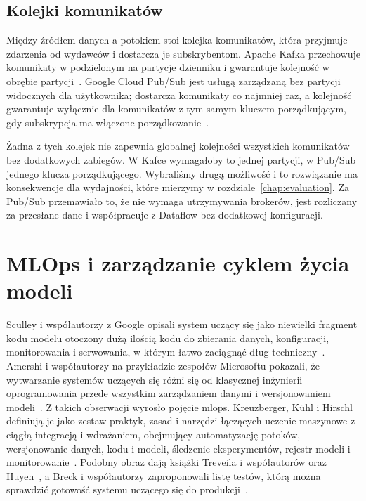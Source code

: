\subsection{Kolejki komunikatów}
\label{sec:tech-messaging}

Między źródłem danych a potokiem stoi kolejka komunikatów, która przyjmuje zdarzenia od wydawców i dostarcza je subskrybentom.
Apache Kafka przechowuje komunikaty w podzielonym na partycje dzienniku i gwarantuje kolejność w obrębie partycji~\cite{wang2015building,dockafka}.
Google Cloud Pub/Sub jest usługą zarządzaną bez partycji widocznych dla użytkownika; dostarcza komunikaty co najmniej raz, a kolejność gwarantuje wyłącznie dla komunikatów z tym samym kluczem porządkującym, gdy subskrypcja ma włączone porządkowanie~\cite{docpubsub,docpubsubordering}.

Żadna z tych kolejek nie zapewnia globalnej kolejności wszystkich komunikatów bez dodatkowych zabiegów.
W Kafce wymagałoby to jednej partycji, w Pub/Sub jednego klucza porządkującego.
Wybraliśmy drugą możliwość i to rozwiązanie ma konsekwencje dla wydajności, które mierzymy w rozdziale~\ref{chap:evaluation}.
Za Pub/Sub przemawiało to, że nie wymaga utrzymywania brokerów, jest rozliczany za przesłane dane i współpracuje z Dataflow bez dodatkowej konfiguracji.

\section{MLOps i zarządzanie cyklem życia modeli}
\label{sec:tech-mlops}

Sculley i współautorzy z Google opisali system uczący się jako niewielki fragment kodu modelu otoczony dużą ilością kodu do zbierania danych, konfiguracji, monitorowania i serwowania, w którym łatwo zaciągnąć dług techniczny~\cite{sculley2015hidden}.
Amershi i współautorzy na przykładzie zespołów Microsoftu pokazali, że wytwarzanie systemów uczących się różni się od klasycznej inżynierii oprogramowania przede wszystkim zarządzaniem danymi i wersjonowaniem modeli~\cite{amershi2019software}.
Z takich obserwacji wyrosło pojęcie \ac{mlops}.
Kreuzberger, Kühl i Hirschl definiują je jako zestaw praktyk, zasad i narzędzi łączących uczenie maszynowe z ciągłą integracją i wdrażaniem, obejmujący automatyzację potoków, wersjonowanie danych, kodu i modeli, śledzenie eksperymentów, rejestr modeli i monitorowanie~\cite{kreuzberger2023machine}.
Podobny obraz dają książki Treveila i współautorów oraz Huyen~\cite{treveil2020introducing,huyen2022designing}, a Breck i współautorzy zaproponowali listę testów, którą można sprawdzić gotowość systemu uczącego się do produkcji~\cite{breck2017ml}.

